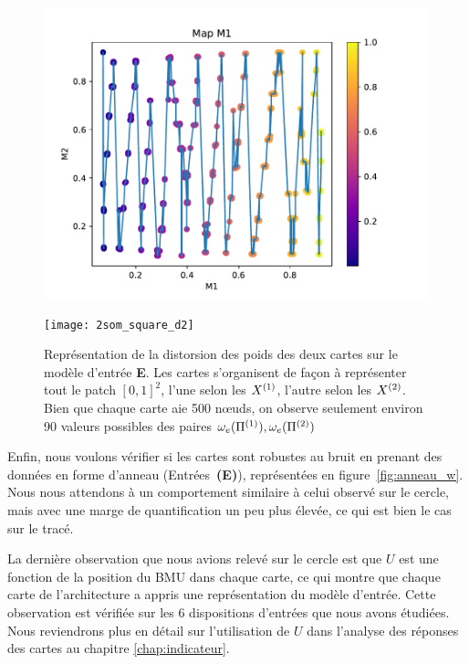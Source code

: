 \documentclass[../main]{subfiles}
\begin{document}
\begin{figure}[t]
	\hfill\begin{minipage}{0.45\textwidth}
		\includegraphics[width=\textwidth]{2som_square_d}
	\end{minipage}
	\begin{minipage}{0.45\textwidth}
		\texttt{[image: 2som\_square\_d2]}
	\end{minipage}\hfill
	\caption{Représentation de la distorsion des poids des deux cartes sur le modèle d'entrée \textbf{E}. Les cartes s'organisent de façon à représenter tout le patch $[0,1]^2$, l'une selon les $X^{({1})}$, l'autre selon les $X^{({2})}$. Bien que chaque carte aie 500 n\oe{}uds, on observe seulement environ 90 valeurs possibles des paires $\omega_e(\Pi^{({1})}),\omega_e(\Pi^{({2})})$ \label{fig:2som_p_d}}
\end{figure}

Enfin, nous voulons vérifier si les cartes sont robustes au bruit en prenant des données en forme d'anneau (Entrées~\textbf{(E)}), représentées en figure~\ref{fig:anneau_w}. Nous nous attendons à un comportement similaire à celui observé sur le cercle, mais avec une marge de quantification un peu plus élevée, ce qui est bien le cas sur le tracé.


La dernière observation que nous avions relevé sur le cercle est que $U$ est une fonction de la position du BMU dans chaque carte, ce qui montre que chaque carte de l'architecture a appris une représentation du modèle d'entrée.
Cette observation est vérifiée sur les 6 dispositions d'entrées que nous avons étudiées.
Nous reviendrons plus en détail sur l'utilisation de $U$ dans l'analyse des réponses des cartes au chapitre \ref{chap:indicateur}.
\end{document}
